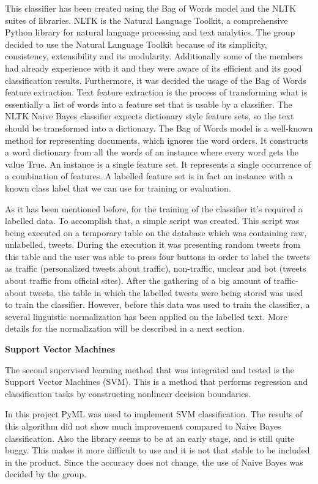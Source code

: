 This classifier has been created using the Bag of Words model and the NLTK suites of libraries. NLTK is the Natural Language Toolkit, a comprehensive Python library for natural language processing and text analytics. The group decided to use the Natural Language Toolkit because of its simplicity, consistency, extensibility and its modularity. Additionally some of the members had already experience with it and they were aware of its efficient and its good classification results. Furthermore, it was decided the usage of the Bag of Words feature extraction. Text feature extraction is the process of transforming what is essentially a list of words into a feature set that is usable by a classifier. The NLTK Naive Bayes classifier expects dictionary style feature sets, so the text should be transformed into a dictionary. The Bag of Words model is a well-known method for representing documents, which ignores the word orders. It constructs a word dictionary from all the words of an instance where every word gets the value True. An instance is a single feature set. It represents a single occurrence of a combination of features. A labelled feature set is in fact an instance with a known class label that we can use for training or evaluation.

As it has been mentioned before, for the training of the classifier it’s required a labelled data. To accomplish that, a simple script was created. This script was being executed on a temporary table on the database which was containing raw, unlabelled, tweets. During the execution it was presenting random tweets from this table and the user was able to press four buttons in order to label the tweets as traffic (personalized tweets about traffic), non-traffic, unclear and bot (tweets about traffic from official sites). After the gathering of a big amount of traffic-about tweets, the table in which the labelled tweets were being stored was used to train the classifier. However, before this data was used to train the classifier, a several linguistic normalization has been applied on the labelled text.  More details for the normalization will be described in a next section.

\textbf{Support Vector Machines}

The second supervised learning method that was integrated and tested is the Support Vector Machines (SVM). This is a method that performs regression and classification tasks by constructing nonlinear decision boundaries.

In this project PyML\cite{website:pyml} was used to implement SVM
classification. The results of this algorithm did not show much improvement
compared to Naive Bayes classification. Also the library seems to be at an
early stage, and is still quite buggy. This makes it more difficult to use
and it is not that stable to be included in the product. Since the accuracy
does not change, the use of Naive Bayes was decided by the group.

